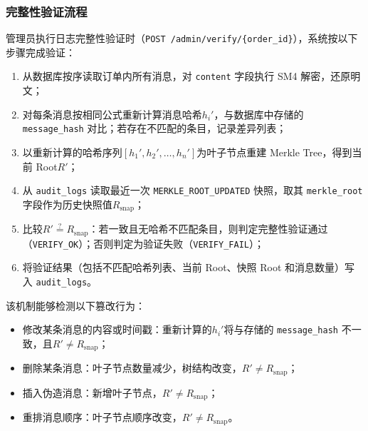 \subsubsection*{完整性验证流程}

管理员执行日志完整性验证时（\texttt{POST /admin/verify/\{order\_id\}}），系统按以下步骤完成验证：



\begin{enumerate}[label=\arabic*., leftmargin=2em]
  \item 从数据库按序读取订单内所有消息，对 \texttt{content} 字段执行 SM4 解密，还原明文；
  \item 对每条消息按相同公式重新计算消息哈希$h_i'$，与数据库中存储的 \texttt{message\_hash} 对比；若存在不匹配的条目，记录差异列表；
  \item 以重新计算的哈希序列$[h_1', h_2', \ldots, h_n']$为叶子节点重建 Merkle Tree，得到当前 Root$R'$；
  \item 从 \texttt{audit\_logs} 读取最近一次 \texttt{MERKLE\_ROOT\_UPDATED} 快照，取其 \texttt{merkle\_root} 字段作为历史快照值$R_{\mathrm{snap}}$；
  \item 比较$R' \stackrel{?}{=} R_{\mathrm{snap}}$：若一致且无哈希不匹配条目，则判定完整性验证通过（\texttt{VERIFY\_OK}）；否则判定为验证失败（\texttt{VERIFY\_FAIL}）；
  \item 将验证结果（包括不匹配哈希列表、当前 Root、快照 Root 和消息数量）写入 \texttt{audit\_logs}。
\end{enumerate}

该机制能够检测以下篡改行为：
\begin{itemize}[leftmargin=2em]
  \item 修改某条消息的内容或时间戳：重新计算的$h_i'$将与存储的 \texttt{message\_hash} 不一致，且$R' \neq R_{\mathrm{snap}}$；
  \item 删除某条消息：叶子节点数量减少，树结构改变，$R' \neq R_{\mathrm{snap}}$；
  \item 插入伪造消息：新增叶子节点，$R' \neq R_{\mathrm{snap}}$；
  \item 重排消息顺序：叶子节点顺序改变，$R' \neq R_{\mathrm{snap}}$。
\end{itemize}
